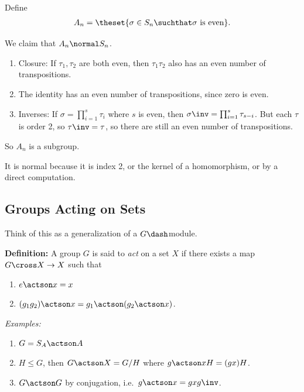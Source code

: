 Define
\begin{align*}
A_{n} = \theset{\sigma \in S_{n} \suchthat \sigma\text{ is even}}
.\end{align*}

We claim that \(A_{n} \normal S_{n}\).

\begin{enumerate}
\def\labelenumi{\arabic{enumi}.}
\item
  Closure: If \(\tau_{1}, \tau_{2}\) are both even, then
  \(\tau_{1}\tau_{2}\) also has an even number of transpositions.
\item
  The identity has an even number of transpositions, since zero is even.
\item
  Inverses: If \(\sigma = \prod_{i=1}^{s} \tau_{i}\) where \(s\) is
  even, then \(\sigma\inv = \prod_{i=1}^{s} \tau_{s-i}\). But each
  \(\tau\) is order 2, so \(\tau\inv = \tau\), so there are still an
  even number of transpositions.
\end{enumerate}

So \(A_{n}\) is a subgroup.

It is normal because it is index 2, or the kernel of a homomorphism, or
by a direct computation.

\hypertarget{groups-acting-on-sets}{%
\subsection{Groups Acting on Sets}\label{groups-acting-on-sets}}

Think of this as a generalization of a \(G\dash\)module.

\textbf{Definition:} A group \(G\) is said to \emph{act} on a set \(X\)
if there exists a map \(G\cross X \to X\) such that

\begin{enumerate}
\def\labelenumi{\arabic{enumi}.}
\item
  \(e\actson x = x\)
\item
  \((g_{1} g_{2})\actson x = g_{1} \actson (g_{2} \actson x)\).
\end{enumerate}

\emph{Examples:}

\begin{enumerate}
\def\labelenumi{\arabic{enumi}.}
\item
  \(G = S_{A} \actson A\)
\item
  \(H \leq G\), then \(G \actson X = G/H\) where
  \(g \actson xH = (gx)H\).
\item
  \(G \actson G\) by conjugation, i.e.~\(g\actson x = gxg\inv\).
\end{enumerate}

